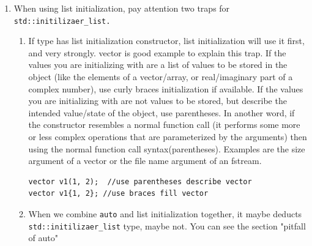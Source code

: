 \documentclass[a4paper,11pt,twoside]{book}
\begin{document}
\begin{itemize}
\begin{enumerate}
		\item When using list initialization, pay attention two traps for \texttt{std::initilizaer\_list.} 
		\begin{enumerate}
			\item If type has list initialization constructor, list initialization will use it first, and very strongly. vector is good example to explain this trap.  If the values you are initializing with are a list of values to be stored in the object (like the elements of a vector/array, or real/imaginary part of a complex number), use curly braces initialization if available.  If the values you are initializing with are not values to be stored, but describe the intended value/state of the object, use parentheses. In another word, if the constructor resembles a normal function call (it performs some more or less complex operations that are parameterized by the arguments) then using the normal function call syntax(parentheses). Examples are the size argument of a vector or the file name argument of an fstream.
\begin{lstlisting}
vector v1(1, 2);  //use parentheses describe vector 
vector v1{1, 2}; //use braces fill vector
\end{lstlisting}			
			
			\item When we combine \texttt{auto} and list initialization together, it maybe deducts \\ \texttt{std::initilizaer\_list} type, maybe not.  You can see the section "pitfall of auto" 
		\end{enumerate}
	\end{enumerate}
	

\end{itemize}
\end{document}

